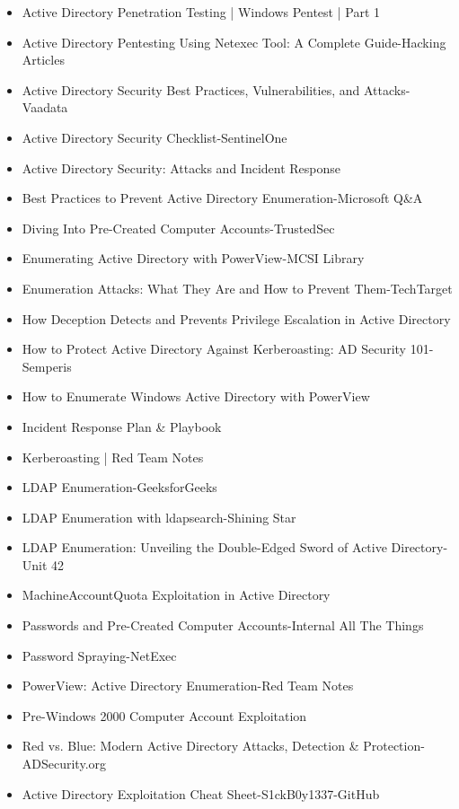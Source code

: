 \begin{itemize}
    \item Active Directory Penetration Testing | Windows Pentest | Part 1
    \item Active Directory Pentesting Using Netexec Tool: A Complete Guide-Hacking Articles
    \item Active Directory Security Best Practices, Vulnerabilities, and Attacks-Vaadata
    \item Active Directory Security Checklist-SentinelOne
    \item Active Directory Security: Attacks and Incident Response
    \item Best Practices to Prevent Active Directory Enumeration-Microsoft Q\&A
    \item Diving Into Pre-Created Computer Accounts-TrustedSec
    \item Enumerating Active Directory with PowerView-MCSI Library
    \item Enumeration Attacks: What They Are and How to Prevent Them-TechTarget
    \item How Deception Detects and Prevents Privilege Escalation in Active Directory
    \item How to Protect Active Directory Against Kerberoasting: AD Security 101-Semperis
    \item How to Enumerate Windows Active Directory with PowerView
    \item Incident Response Plan \& Playbook
    \item Kerberoasting | Red Team Notes
    \item LDAP Enumeration-GeeksforGeeks
    \item LDAP Enumeration with ldapsearch-Shining Star
    \item LDAP Enumeration: Unveiling the Double-Edged Sword of Active Directory-Unit 42
    \item MachineAccountQuota Exploitation in Active Directory
    \item Passwords and Pre-Created Computer Accounts-Internal All The Things
    \item Password Spraying-NetExec
    \item PowerView: Active Directory Enumeration-Red Team Notes
    \item Pre-Windows 2000 Computer Account Exploitation
    \item Red vs. Blue: Modern Active Directory Attacks, Detection \& Protection-ADSecurity.org
    \item Active Directory Exploitation Cheat Sheet-S1ckB0y1337-GitHub

\end{itemize}
